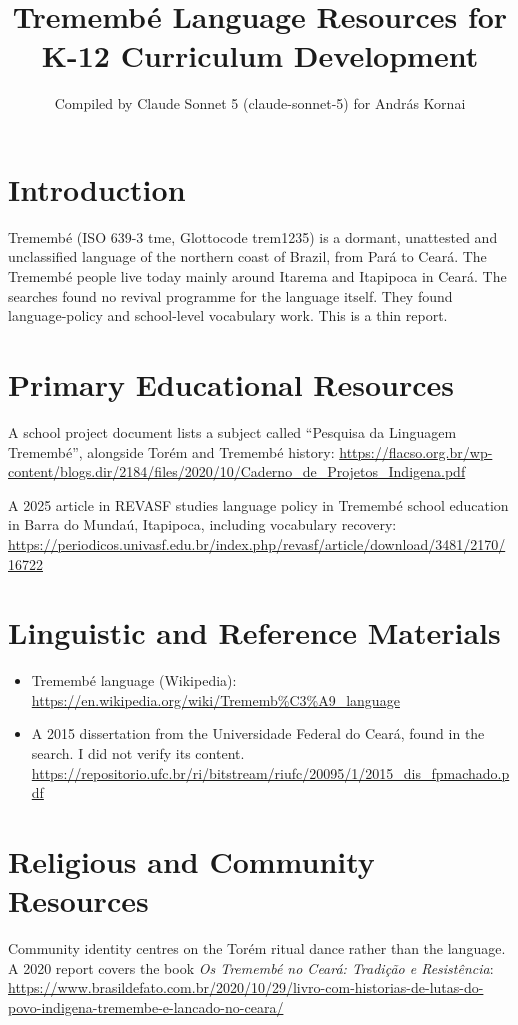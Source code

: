 \documentclass[12pt]{article}
\title{Tremembé Language Resources for K-12 Curriculum Development}
\author{Compiled by Claude Sonnet 5 (claude-sonnet-5) for Andr\'as Kornai}
\date{}
\begin{document}
\maketitle

\section{Introduction}
Tremembé (ISO 639-3 tme, Glottocode trem1235) is a dormant, unattested and unclassified language of the northern coast of Brazil, from Pará to Ceará. The Tremembé people live today mainly around Itarema and Itapipoca in Ceará. The searches found no revival programme for the language itself. They found language-policy and school-level vocabulary work. This is a thin report.

\section{Primary Educational Resources}
A school project document lists a subject called ``Pesquisa da Linguagem Tremembé'', alongside Torém and Tremembé history: \url{https://flacso.org.br/wp-content/blogs.dir/2184/files/2020/10/Caderno_de_Projetos_Indigena.pdf}

A 2025 article in REVASF studies language policy in Tremembé school education in Barra do Mundaú, Itapipoca, including vocabulary recovery: \url{https://periodicos.univasf.edu.br/index.php/revasf/article/download/3481/2170/16722}

\section{Linguistic and Reference Materials}
\begin{itemize}
\item Tremembé language (Wikipedia): \url{https://en.wikipedia.org/wiki/Trememb%C3%A9_language}
\item A 2015 dissertation from the Universidade Federal do Ceará, found in the search. I did not verify its content. \url{https://repositorio.ufc.br/ri/bitstream/riufc/20095/1/2015_dis_fpmachado.pdf}
\end{itemize}

\section{Religious and Community Resources}
Community identity centres on the Torém ritual dance rather than the language. A 2020 report covers the book \emph{Os Tremembé no Ceará: Tradição e Resistência}: \url{https://www.brasildefato.com.br/2020/10/29/livro-com-historias-de-lutas-do-povo-indigena-tremembe-e-lancado-no-ceara/}
\end{document}
